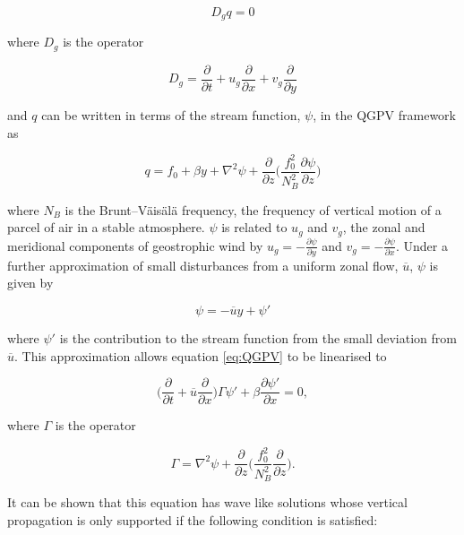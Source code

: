 \begin{equation} \label{eq-PV_conserved}
D_g q = 0
\end{equation}

\noindent where $D_g$ is the operator 

\begin{equation}\label{eq:D_g}
D_g = \frac{\partial}{\partial t} + u_g \frac{\partial}{\partial x} + v_g\frac{\partial}{\partial y} 
\end{equation}

\noindent and $q$ can be written in terms of the stream function, $\psi$, in the QGPV framework as

\begin{equation} \label{eq:QGPV}
q = f_0 + \beta y + \nabla^2 \psi + \frac{\partial}{\partial z}\bigg(\frac{f_0^2}{N_B^2} \frac{\partial \psi}{\partial z}\bigg)
\end{equation}

\noindent where $N_B$ is the Brunt–Väisälä frequency, the frequency of vertical motion of a parcel of air in a stable atmosphere. $\psi$ is related to $u_g$ and $v_g$, the zonal and meridional components of geostrophic wind by $u_g = -\frac{\partial \psi}{\partial y}$ and $v_g = -\frac{\partial \psi}{\partial x}$. Under a further approximation of small disturbances from a uniform zonal flow, $\overline{u}$, $\psi$ is given by

\begin{equation} \label{eq:Zonal_flow_SF}
\psi = -\overline{u} y + \psi '
\end{equation}

\noindent where $\psi'$ is the contribution to the stream function from the small deviation from $\overline{u}$. This approximation allows equation \ref{eq:QGPV} to be linearised to

\begin{equation} \label{eq:Linearised_QGPV}
\bigg(\frac{\partial}{\partial t} + \overline{u} \frac{\partial}{\partial x}\bigg)\Gamma \psi' + \beta \frac{\partial \psi'}{\partial x} = 0,
\end{equation}

\noindent where $\Gamma$ is the operator

\begin{equation} \label{eq:ellipse_operator}
\Gamma = \nabla^2 \psi + \frac{\partial}{\partial z}\bigg(\frac{f_0^2}{N_B^2}\frac{\partial}{\partial z}\bigg).
\end{equation}

It can be shown that this equation has wave like solutions whose vertical propagation is only supported if the following condition is satisfied:

